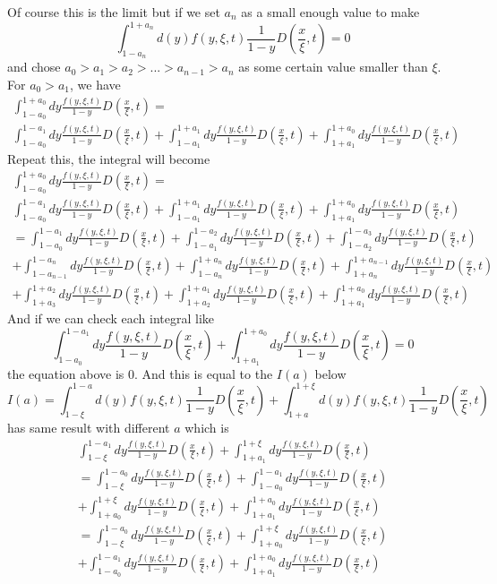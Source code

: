 \documentclass[preprintnumbers,prd,superscriptaddress,preprint]{revtex4-1}
\begin{document}
	Of course this is the limit but if we set $a_{n}$ as a small enough value to make  \[
	\int_{1-a_{n}}^{1+a_{n}}d(y)f(y,\xi,t)\frac{1}{1-y}D(\frac{x}{\xi},t)=0
	\] and chose $a_{0}>a_{1}>a_{2}>...>a_{n-1}>a_{n}$ as some certain value smaller than $\xi$. For $a_{0}>a_{1}$, we have 
	\begin{multline*}
		\int_{1-a_{0}}^{1+a_{0}}dy\frac{f(y,\xi,t)}{1-y}D(\frac{x}{\xi},t)=\\
		\int_{1-a_{0}}^{1-a_{1}}dy\frac{f(y,\xi,t)}{1-y}D(\frac{x}{\xi},t)+\int_{1-a_{1}}^{1+a_{1}}dy\frac{f(y,\xi,t)}{1-y}D(\frac{x}{\xi},t)+\int_{1+a_{1}}^{1+a_{0}}dy\frac{f(y,\xi,t)}{1-y}D(\frac{x}{\xi},t)
	\end{multline*}
	Repeat this, the integral will become
	\begin{multline*}
		\int_{1-a_{0}}^{1+a_{0}}dy\frac{f(y,\xi,t)}{1-y}D(\frac{x}{\xi},t)=\\
		\int_{1-a_{0}}^{1-a_{1}}dy\frac{f(y,\xi,t)}{1-y}D(\frac{x}{\xi},t)+\int_{1-a_{1}}^{1+a_{1}}dy\frac{f(y,\xi,t)}{1-y}D(\frac{x}{\xi},t)+\int_{1+a_{1}}^{1+a_{0}}dy\frac{f(y,\xi,t)}{1-y}D(\frac{x}{\xi},t)\\
		=\int_{1-a_{0}}^{1-a_{1}}dy\frac{f(y,\xi,t)}{1-y}D(\frac{x}{\xi},t)+\int_{1-a_{1}}^{1-a_{2}}dy\frac{f(y,\xi,t)}{1-y}D(\frac{x}{\xi},t)+\int_{1-a_{2}}^{1-a_{3}}dy\frac{f(y,\xi,t)}{1-y}D(\frac{x}{\xi},t)\\
		+\int_{1-a_{n-1}}^{1-a_{n}}dy\frac{f(y,\xi,t)}{1-y}D(\frac{x}{\xi},t)+\int_{1-a_{n}}^{1+a_{n}}dy\frac{f(y,\xi,t)}{1-y}D(\frac{x}{\xi},t)+\int_{1+a_{n}}^{1+a_{n-1}}dy\frac{f(y,\xi,t)}{1-y}D(\frac{x}{\xi},t)\\
		+\int_{1+a_{3}}^{1+a_{2}}dy\frac{f(y,\xi,t)}{1-y}D(\frac{x}{\xi},t)+\int_{1+a_{2}}^{1+a_{1}}dy\frac{f(y,\xi,t)}{1-y}D(\frac{x}{\xi},t)+\int_{1+a_{1}}^{1+a_{0}}dy\frac{f(y,\xi,t)}{1-y}D(\frac{x}{\xi},t)
	\end{multline*}
	And if we can check each integral like 
	\[\int_{1-a_{0}}^{1-a_{1}}dy\frac{f(y,\xi,t)}{1-y}D(\frac{x}{\xi},t)+\int_{1+a_{1}}^{1+a_{0}}dy\frac{f(y,\xi,t)}{1-y}D(\frac{x}{\xi},t)=0\] the equation above is $0$. And this is equal to the $I(a)$ below  
	\[
	I(a)=\int_{1-\xi}^{1-a}d(y)f(y,\xi,t)\frac{1}{1-y}D(\frac{x}{\xi},t)+\int_{1+a}^{1+\xi}d(y)f(y,\xi,t)\frac{1}{1-y}D(\frac{x}{\xi},t)
	\]
	has same result with different $a$ which is 
	\begin{gather*}
		\int_{1-\xi}^{1-a_{1}}dy\frac{f(y,\xi,t)}{1-y}D(\frac{x}{\xi},t)+\int_{1+a_{1}}^{1+\xi}dy\frac{f(y,\xi,t)}{1-y}D(\frac{x}{\xi},t)\\
		=\int_{1-\xi}^{1-a_{0}}dy\frac{f(y,\xi,t)}{1-y}D(\frac{x}{\xi},t)+\int_{1-a_{0}}^{1-a_{1}}dy\frac{f(y,\xi,t)}{1-y}D(\frac{x}{\xi},t)\\
		+\int_{1+a_{0}}^{1+\xi}dy\frac{f(y,\xi,t)}{1-y}D(\frac{x}{\xi},t)+\int_{1+a_{1}}^{1+a_{0}}dy\frac{f(y,\xi,t)}{1-y}D(\frac{x}{\xi},t)\\
		=\int_{1-\xi}^{1-a_{0}}dy\frac{f(y,\xi,t)}{1-y}D(\frac{x}{\xi},t)+\int_{1+a_{0}}^{1+\xi}dy\frac{f(y,\xi,t)}{1-y}D(\frac{x}{\xi},t)\\
		+\int_{1-a_{0}}^{1-a_{1}}dy\frac{f(y,\xi,t)}{1-y}D(\frac{x}{\xi},t)+\int_{1+a_{1}}^{1+a_{0}}dy\frac{f(y,\xi,t)}{1-y}D(\frac{x}{\xi},t)
	\end{gather*}
\end{document}
